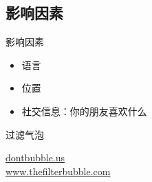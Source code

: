 \subsection{影响因素}
\begin{frame}{影响因素}
	\begin{itemize}[<+->]
		\item 语言
		\item 位置
		\item 社交信息：你的朋友喜欢什么
	\end{itemize}
\end{frame}

\begin{frame}{过滤气泡}
	\begin{center}
		\href{http://dontbubble.us}{dontbubble.us}\\
		\href{http://www.thefilterbubble.com/}{www.thefilterbubble.com}
	\end{center}
\end{frame}

